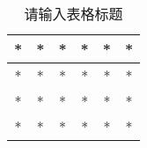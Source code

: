 \begin{table}[ht]
\centering
\caption{请输入表格标题}\label{aa_tab1}
\begin{tabular}{|c|c|c|c|c|c|}
\hline
* & * & * & * & * & * \\
\hline
* & * & * & * & * & * \\
\hline
* & * & * & * & * & * \\
\hline
* & * & * & * & * & * \\
\hline
\end{tabular}
\end{table}%

